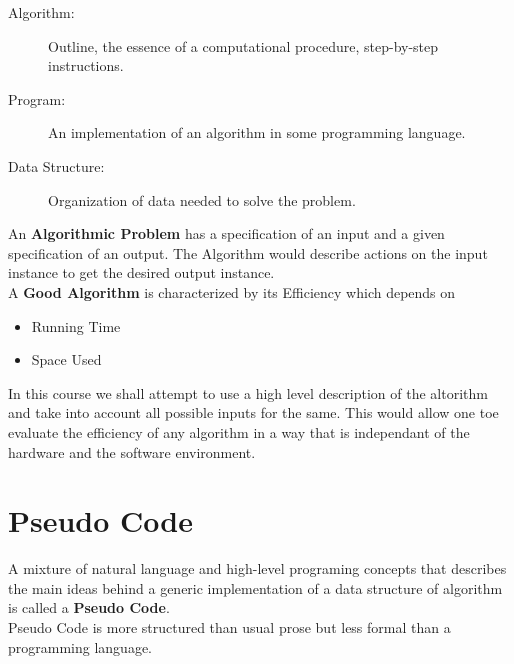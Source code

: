 \begin{description}
		\item[Algorithm:] Outline, the essence of a computational procedure, step-by-step instructions.
		\item[Program:] An implementation of an algorithm in some programming language.
		\item[Data Structure:] Organization of data needed to solve the problem.  
	\end{description}
	An \textbf{Algorithmic Problem} has a specification of an input and a given specification of an output.
	The Algorithm would describe actions on the input instance to get the desired output instance.\\

	A \textbf{Good Algorithm} is characterized by its Efficiency which depends on
	\begin{itemize}
		\item Running Time
		\item Space Used
	\end{itemize}
	In this course we shall attempt to use a high level description of the altorithm and take into account all possible inputs for the same. This would allow one toe evaluate the efficiency of any algorithm in a way that is independant of the hardware and the software environment.\\

	\section{Pseudo Code}
	A mixture of natural language and high-level programing concepts that describes the main ideas behind a generic implementation of a data structure of algorithm is called a \textbf{Pseudo Code}.\\

	Pseudo Code is more structured than usual prose but less formal than a programming language.

